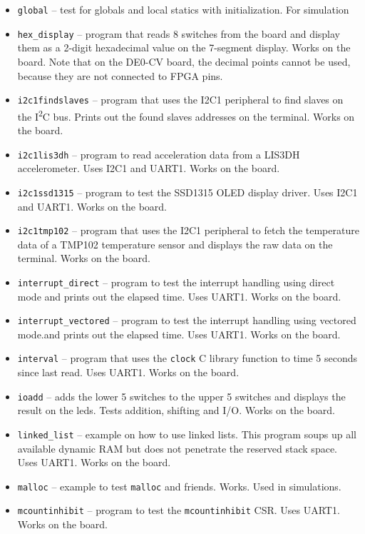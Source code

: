 \documentclass[12pt]{article}
\begin{document}
\begin{itemize}
\item \lstinline|global| -- test for globals and local statics with initialization. For simulation
\item \lstinline|hex_display| -- program that reads 8 switches from the board and display them as a 2-digit hexadecimal value on the 7-segment display. Works on the board. Note that on the DE0-CV board, the decimal points cannot be used, because they are not connected to FPGA pins.
\item \lstinline|i2c1findslaves| -- program that uses the I2C1 peripheral to find slaves on the I\textsuperscript{2}C bus. Prints out the found slaves addresses on the terminal. Works on the board.
\item \lstinline|i2c1lis3dh| -- program to read acceleration data from a LIS3DH accelerometer. Uses I2C1 and UART1. Works on the board.
\item \lstinline|i2c1ssd1315| -- program to test the SSD1315 OLED display driver. Uses I2C1 and UART1. Works on the board.
\item \lstinline|i2c1tmp102| -- program that uses the I2C1 peripheral to fetch the temperature data of a TMP102 temperature sensor and displays the raw data on the terminal. Works on the board.
\item \lstinline|interrupt_direct| -- program to test the interrupt handling using direct mode and prints out the elapsed time. Uses UART1. Works on the board.
\item \lstinline|interrupt_vectored| -- program to test the interrupt handling using vectored mode.and prints out the elapsed time. Uses UART1. Works on the board.
\item \lstinline|interval| -- program that uses the \lstinline|clock| C library function to time 5 seconds since last read. Uses UART1. Works on the board.
\item \lstinline|ioadd| -- adds the lower 5 switches to the upper 5 switches and displays the result on the leds. Tests addition, shifting and I/O. Works on the board.
\item \lstinline|linked_list| -- example on how to use linked lists. This program soups up all available dynamic RAM but does not penetrate the reserved stack space. Uses UART1. Works on the board.
\item \lstinline|malloc| -- example to test \lstinline|malloc| and friends. Works. Used in simulations.
\item \lstinline|mcountinhibit| -- program to test the \lstinline|mcountinhibit| CSR. Uses UART1. Works on the board.

\end{itemize}
\end{document}
